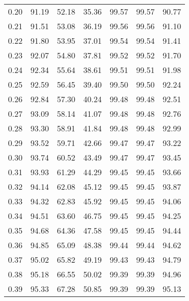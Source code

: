 \begin{tabular}{|c|c|c|c|c|c|c|}
      0.20 &     91.19 &     52.18 &      35.36 &   99.57 &      99.57 &         90.77 \\
      0.21 &     91.51 &     53.08 &      36.19 &   99.56 &      99.56 &         91.10 \\
      0.22 &     91.80 &     53.95 &      37.01 &   99.54 &      99.54 &         91.41 \\
      0.23 &     92.07 &     54.80 &      37.81 &   99.52 &      99.52 &         91.70 \\
      0.24 &     92.34 &     55.64 &      38.61 &   99.51 &      99.51 &         91.98 \\
      0.25 &     92.59 &     56.45 &      39.40 &   99.50 &      99.50 &         92.24 \\
      0.26 &     92.84 &     57.30 &      40.24 &   99.48 &      99.48 &         92.51 \\
      0.27 &     93.09 &     58.14 &      41.07 &   99.48 &      99.48 &         92.76 \\
      0.28 &     93.30 &     58.91 &      41.84 &   99.48 &      99.48 &         92.99 \\
      0.29 &     93.52 &     59.71 &      42.66 &   99.47 &      99.47 &         93.22 \\
      0.30 &     93.74 &     60.52 &      43.49 &   99.47 &      99.47 &         93.45 \\
      0.31 &     93.93 &     61.29 &      44.29 &   99.45 &      99.45 &         93.66 \\
      0.32 &     94.14 &     62.08 &      45.12 &   99.45 &      99.45 &         93.87 \\
      0.33 &     94.32 &     62.83 &      45.92 &   99.45 &      99.45 &         94.06 \\
      0.34 &     94.51 &     63.60 &      46.75 &   99.45 &      99.45 &         94.25 \\
      0.35 &     94.68 &     64.36 &      47.58 &   99.45 &      99.45 &         94.44 \\
      0.36 &     94.85 &     65.09 &      48.38 &   99.44 &      99.44 &         94.62 \\
      0.37 &     95.02 &     65.82 &      49.19 &   99.43 &      99.43 &         94.79 \\
      0.38 &     95.18 &     66.55 &      50.02 &   99.39 &      99.39 &         94.96 \\
      0.39 &     95.33 &     67.28 &      50.85 &   99.39 &      99.39 &         95.13 \\

\end{tabular}
